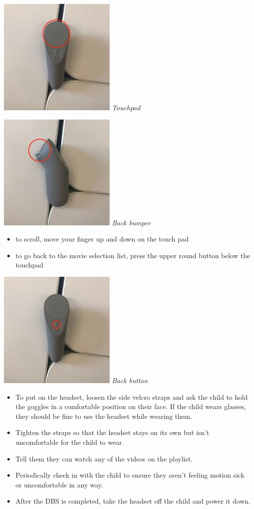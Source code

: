 \documentclass[]{book}
\providecommand{\tightlist}{%
  \setlength{\itemsep}{0pt}\setlength{\parskip}{0pt}}
\begin{document}
\includegraphics{images/dbs/3.jpeg} \emph{Touchpad}

\includegraphics{images/dbs/4.jpeg} \emph{Back bumper}

\begin{itemize}
\tightlist
\item
  to scroll, move your finger up and down on the touch pad
\item
  to go back to the movie selection list, press the upper round button below the touchpad
\end{itemize}

\includegraphics{images/dbs/5.jpeg} \emph{Back button}

\begin{itemize}
\tightlist
\item
  To put on the headset, loosen the side velcro straps and ask the child to hold the goggles in a comfortable position on their face. If the child wears glasses, they should be fine to use the headset while wearing them.
\item
  Tighten the straps so that the headset stays on its own but isn't uncomfortable for the child to wear.
\item
  Tell them they can watch any of the videos on the playlist.
\item
  Periodically check in with the child to ensure they aren't feeling motion sick or uncomfortable in any way.
\item
  After the DBS is completed, take the headset off the child and power it down.
\end{itemize}
\end{document}

